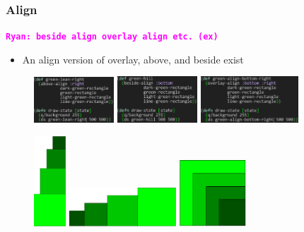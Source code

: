 \documentclass{beamer}
\newcommand{\comment}[1]{{\bf \tt  {#1}}}
\newcommand{\rmcomment}[1]{\textcolor{magenta}{\comment{Ryan: {#1}}}}
\begin{document}
\begin{frame}
\frametitle{Align}
\rmcomment{beside align overlay align etc. (ex)}
	\begin{itemize}
		\item An align version of overlay, above, and beside exist
	\end{itemize}
		\begin{figure}
		\includegraphics[width=3cm]{PresentationImages/greenLeanRightCode.png}
		\hspace{0.25cm}
		\includegraphics[width=3cm]{PresentationImages/greenSlopeBottomCode.png}
		\hspace{0.25cm}
		\includegraphics[width=3.65cm]{PresentationImages/greenAlignBottomRightCode.png}
	\end{figure}

	\begin{figure}
		\includegraphics[width=1.2cm]{PresentationImages/greenLeanRight.png}
		\hspace{1cm} 	\vspace{0.3cm}
		\includegraphics[width=4cm]{PresentationImages/greenSlopeBottom.png}
		\hspace{1cm} 	\vspace{0.3cm}
		\includegraphics[width=2.5cm]{PresentationImages/greenAlignBottomRight.png}
	\end{figure}

\end{frame}
\end{document}
